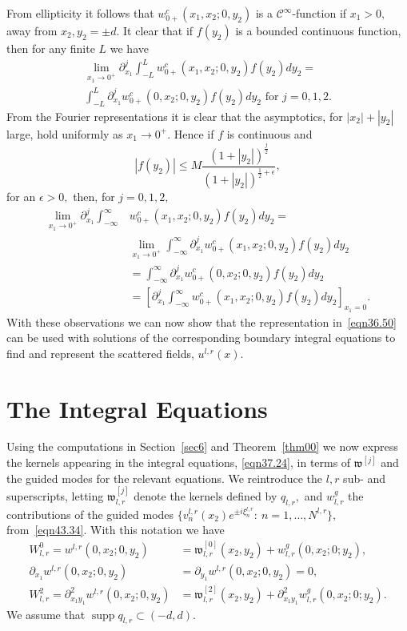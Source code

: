 \documentclass[11pt]{article}
\newcommand\fw{\mathfrak w}
\newcommand\cC{\mathcal{C}}
\newcommand\pa{\partial}
\newcommand\supp{\operatorname{supp}}
\theoremstyle{definition}
\theoremstyle{remark}
\begin{document}
    
From ellipticity it follows that $w^c_{0+}(x_1,x_2;0,y_2)$ is a 
$\cC^{\infty}$-function if $x_1>0,$ away from $x_2,y_2=\pm d.$  It clear that if $f(y_2)$
is a bounded continuous function, then for any finite $L$ we have
\begin{multline}
  \lim_{x_1\to
    0^+}\pa_{x_1}^j\int_{-L}^{L}w^c_{0+}(x_1,x_2;0,y_2)f(y_2)dy_2=\\
  \int_{-L}^{L}\pa_{x_1}^jw^c_{0+}(0,x_2;0,y_2)f(y_2)dy_2\text{ for }j=0,1,2.
\end{multline}
From the Fourier representations it is clear that the asymptotics, for
$|x_2|+|y_2|$ large, hold uniformly as $x_1\to 0^+.$ Hence if $f$ is
continuous and
\begin{equation}
  |f(y_2)|\leq M\frac{(1+|y_2|)^{\frac j2}}{(1+|y_2|)^{\frac 12+\epsilon}},
\end{equation}
for an $\epsilon>0,$ then,  for $j=0,1,2,$
\begin{equation}
  \begin{split}
  \lim_{x_1\to
    0^+}\pa_{x_1}^j\int_{-\infty}^{\infty}&w^c_{0+}(x_1,x_2;0,y_2)f(y_2)dy_2=\\
&\lim_{x_1\to 0^+}
\int_{-\infty}^{\infty}\pa_{x_1}^jw^c_{0+}(x_1,x_2;0,y_2)f(y_2)dy_2\\
&=\int_{-\infty}^{\infty}\pa_{x_1}^jw^c_{0+}(0,x_2;0,y_2)f(y_2)dy_2\\
&=\left[\pa_{x_1}^j\int_{-\infty}^{\infty}w^c_{0+}(x_1,x_2;0,y_2)f(y_2)dy_2\right]_{x_1=0}.
  \end{split}
\end{equation}
With these observations we can now show that the representation
in~\eqref{eqn36.50} can be used with solutions of the corresponding
boundary integral equations to find and represent the scattered
fields, $u^{l,r}(x).$


   \section{The Integral Equations}\label{sec8}
  Using the computations in Section~\ref{sec6} and Theorem~\ref{thm00} we now
  express the kernels appearing in the integral equations, \eqref{eqn37.24}, in
  terms of $\fw^{[j]}$ and the guided modes for the relevant equations. We
  reintroduce the $l,r$ sub- and superscripts, letting $\fw^{[j]}_{l,r}$ denote
  the kernels defined by $q_{l,r},$ and $w^g_{l,r}$ the contributions of the
  guided modes $\{v_n^{l,r}(x_2)e^{\pm i\xi_n^{l,r}}:\:n=1,\dots, N^{l,r}\},$
  from~\eqref{eqn43.34}. With this notation we have
   \begin{equation}
     \begin{split}
       W^0_{l,r}=w^{l,r}(0,x_2;0,y_2)&=\fw^{[0]}_{l,r}(x_2,y_2)+w^g_{l,r}(0,x_2;0;y_2),\\
       \pa_{x_1}w^{l,r}(0,x_2;0,y_2)&=\pa_{y_1}w^{l,r}(0,x_2;0,y_2)=0,\\
       W^{2}_{l,r}=\pa^2_{x_1y_1}w^{l,r}(0,x_2;0,y_2)&=\fw^{[2]}_{l,r}(x_2,y_2)+
       \pa^2_{x_1y_1}w^g_{l,r}(0,x_2;0;y_2).
       \end{split}
   \end{equation}
   We assume that $\supp q_{l,r}\subset (-d,d).$ 
\end{document}
